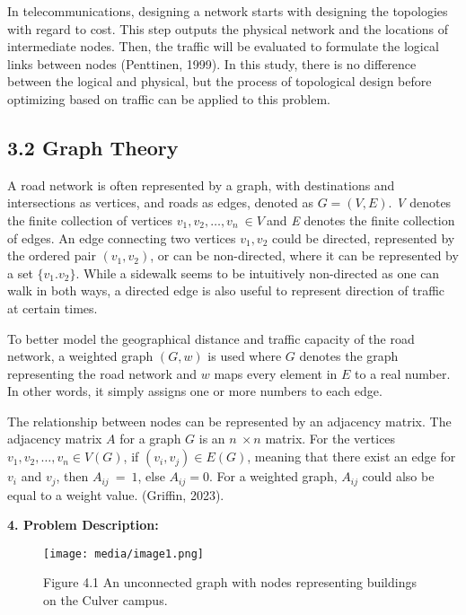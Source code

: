 \documentclass[11pt]{article}
\begin{document}
In telecommunications, designing a network starts with designing the
topologies with regard to cost. This step outputs the physical network
and the locations of intermediate nodes. Then, the traffic will be
evaluated to formulate the logical links between nodes (Penttinen,
1999). In this study, there is no difference between the logical and
physical, but the process of topological design before optimizing based
on traffic can be applied to this problem.

\subsection{3.2 Graph Theory}

A road network is often represented by a graph, with destinations and
intersections as vertices, and roads as edges, denoted as \(G = (V,E)\).
\emph{V} denotes the finite collection of vertices
\(v_{1},v_{2},\ldots,v_{n}\  \in V\ \)and \emph{E} denotes the finite
collection of edges. An edge connecting two vertices \(v_{1},v_{2}\)
could be directed, represented by the ordered pair
\(\left( v_{1},v_{2} \right)\), or can be non-directed, where it can be
represented by a set \(\text{\{}v_{1}.v_{2}\text{\}}\). While a sidewalk
seems to be intuitively non-directed as one can walk in both ways, a
directed edge is also useful to represent direction of traffic at
certain times.

To better model the geographical distance and traffic capacity of the
road network, a weighted graph \((G,w)\) is used where \(G\) denotes the
graph representing the road network and \(w\) maps every element in
\(E\) to a real number. In other words, it simply assigns one or more
numbers to each edge.

The relationship between nodes can be represented by an adjacency
matrix. The adjacency matrix \(A\) for a graph \(G\) is an
\(n\  \times n\) matrix. For the vertices
\(v_{1},v_{2},\ldots,v_{n} \in V(G)\), if
\(\left( v_{i},v_{j} \right) \in E(G)\), meaning that there exist an
edge for \(v_{i}\) and \(v_{j}\), then \(A_{ij}\  = \ 1\), else
\(A_{ij} = 0\). For a weighted graph, \(A_{ij}\) could also be equal to
a weight value. (Griffin, 2023).

\textbf{4. Problem Description:}

\begin{figure}
\centering
\texttt{[image: media/image1.png]}
\caption{Figure 4.1 An unconnected graph with nodes representing
buildings on the Culver campus.}
\end{figure}
\end{document}
